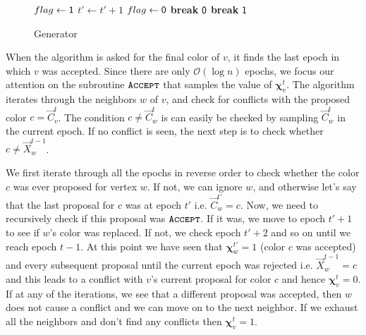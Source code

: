 \begin{wrapfigure}[22]{l}{0.51\textwidth}
\vspace{-2em}
\begin{framed}
    \caption{Generator}
    \label{alg:coloring}
    \begin{algorithmic}[1]
                    \State {}
                \EndIf
                        \State $flag\gets \mathsf{1}$
                            \State $t'\gets t' + 1$
                                \State $flag\gets \mathsf{0}$
                                \State \textbf{break}
                            \EndIf
                        \EndWhile
                            \State \Return $\mathsf{0}$
                        \EndIf
                        \State \textbf{break}
                   \EndIf
                \EndFor
            \EndFor
            \State \Return $\mathsf{1}$
        \EndProcedure
    \end{algorithmic}
\end{framed}
\end{wrapfigure}

When the algorithm is asked for the final color of $v$, it finds the last epoch in which $v$ was accepted.
Since there are only $\mathcal O(\log n)$ epochs, we focus our attention on the subroutine $\texttt{\textsc{Accept}}$ that samples the value of $\bm\chi^t_v$.
The algorithm iterates through the neighbors $w$ of $v$, and check for conflicts with the proposed color $c=\vec C^t_v$.
The condition $c\not= \vec C^t_w$ is can easily be checked by sampling $\vec C^t_w$ in the current epoch.
If no conflict is seen, the next step is to check whether $c\not= \vec X^{t-1}_w$.

We first iterate through all the epochs in reverse order to check whether the color $c$ was ever proposed for vertex $w$.
If not, we can ignore $w$, and otherwise let's say that the last proposal for $c$ was at epoch $t'$ i.e. $\vec C^{t'}_w = c$.
Now, we need to recursively check if this proposal was $\texttt{\textsc{Accept}}$.
If it was, we move to epoch $t'+1$ to see if $w$'s color was replaced.
If not, we check epoch $t'+2$ and so on until we reach epoch $t-1$.
At this point we have seen that $\bm\chi^{t'}_w = 1$ (color $c$ was accepted) and every subsequent proposal until the current epoch was rejected
i.e. $\vec X^{t-1}_w = c$ and this leads to a conflict with $v$'s current proposal for color $c$ and hence $\bm\chi^t_v = 0$.
If at any of the iterations, we see that a different proposal was accepted, then $w$ does not cause a conflict and we can move on to the next neighbor.
If we exhaust all the neighbors and don't find any conflicts then $\bm\chi^t_v = 1$.

